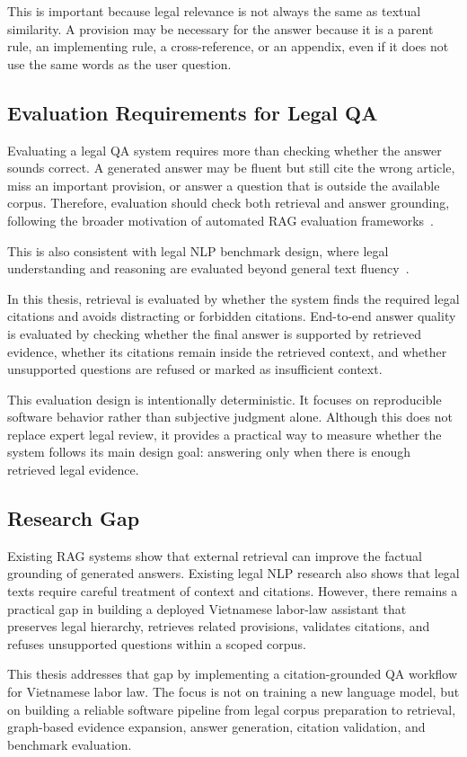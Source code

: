 This is important because legal relevance is not always the same as textual similarity. A provision may be necessary for the answer because it is a parent rule, an implementing rule, a cross-reference, or an appendix, even if it does not use the same words as the user question.

\subsection{Evaluation Requirements for Legal QA}
Evaluating a legal QA system requires more than checking whether the answer sounds correct. A generated answer may be fluent but still cite the wrong article, miss an important provision, or answer a question that is outside the available corpus. Therefore, evaluation should check both retrieval and answer grounding, following the broader motivation of automated RAG evaluation frameworks~\cite{es2023ragas,saadfalcon2023ares}.

This is also consistent with legal NLP benchmark design, where legal understanding and reasoning are evaluated beyond general text fluency~\cite{chalkidis2021lexglue}.

In this thesis, retrieval is evaluated by whether the system finds the required legal citations and avoids distracting or forbidden citations. End-to-end answer quality is evaluated by checking whether the final answer is supported by retrieved evidence, whether its citations remain inside the retrieved context, and whether unsupported questions are refused or marked as insufficient context.

This evaluation design is intentionally deterministic. It focuses on reproducible software behavior rather than subjective judgment alone. Although this does not replace expert legal review, it provides a practical way to measure whether the system follows its main design goal: answering only when there is enough retrieved legal evidence.

\subsection{Research Gap}
Existing RAG systems show that external retrieval can improve the factual grounding of generated answers. Existing legal NLP research also shows that legal texts require careful treatment of context and citations. However, there remains a practical gap in building a deployed Vietnamese labor-law assistant that preserves legal hierarchy, retrieves related provisions, validates citations, and refuses unsupported questions within a scoped corpus.

This thesis addresses that gap by implementing a citation-grounded QA workflow for Vietnamese labor law. The focus is not on training a new language model, but on building a reliable software pipeline from legal corpus preparation to retrieval, graph-based evidence expansion, answer generation, citation validation, and benchmark evaluation.
